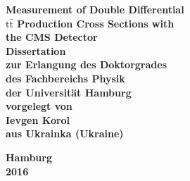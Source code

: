\begin{titlepage}

\begin{center}

{ \huge \bfseries Measurement of Double Differential}\\[0.4cm]
{ \huge \bfseries $\text{t}\bar{\text{t}}$ Production Cross Sections with}\\[0.4cm]
{ \huge \bfseries the CMS Detector}\\[5.0cm]

{\LARGE \bfseries Dissertation}\\[0.4cm]
{\LARGE \bfseries zur Erlangung des Doktorgrades}\\[0.4cm]
{\LARGE \bfseries des Fachbereichs Physik}\\[0.4cm]
{\LARGE \bfseries der Universit\"at Hamburg}\\[5.0cm]

{\Large \bfseries vorgelegt von}\\[0.4cm]
{\Large \bfseries Ievgen Korol}\\[0.4cm]
{\Large \bfseries aus Ukrainka (Ukraine)}

\vfill

{\Large \bfseries Hamburg}\\[0.4cm]
{\Large \bfseries 2016}\\[0.4cm]

\end{center}

\end{titlepage}